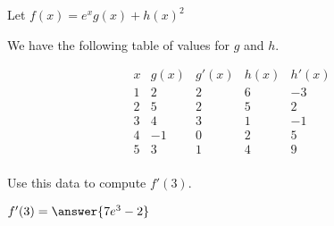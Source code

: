 \documentclass{ximera}
\author{Steven Gubkin}
\begin{document}
\begin{exercise}



Let $f(x) = e^xg(x)+h(x)^2$

We have the following table of values for $g$ and $h$.

\[
\begin{array}{c|c|c|c|c}
 x & g(x) & g'(x) & h(x) & h'(x)\\ \hline
 1 & 2 & 2 & 6 & -3\\ 
 2 & 5 & 2 & 5 & 2\\
 3 & 4 & 3 & 1 & -1\\ 
 4 & -1 & 0 & 2 & 5\\ 
 5 & 3 & 1 & 4 & 9\\ 
\end{array}
\]

Use this data to compute $f'(3)$.

\begin{prompt}
	$f'(3) = \answer{7e^3-2}$
\end{prompt}

\end{exercise}
\end{document}
